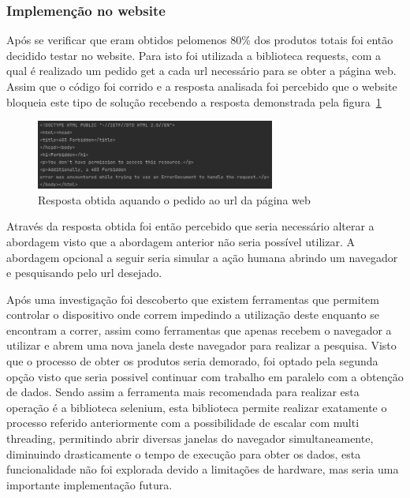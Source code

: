 \newpage

\subsubsection{Implemenção no website}

Após se verificar que eram obtidos pelomenos 80\% dos produtos totais foi então decidido testar no website. Para isto foi utilizada a biblioteca
requests, com a qual é realizado um pedido get a cada url necessário para se obter a página web. Assim que o código foi corrido e a resposta analisada
foi percebido que o website bloqueia este tipo de solução recebendo a resposta demonstrada pela figura~\ref{fig:56}

\begin{figure}[htb]
    \centering
    
    \includegraphics[width=0.7\textwidth]{images/implementacao/scraper/forbiden_response.png}
    \caption{Resposta obtida aquando o pedido ao url da página web}
    \label{fig:56}
\end{figure}

Através da resposta obtida foi então percebido que seria necessário alterar a abordagem visto que a abordagem anterior não seria possível utilizar.
A abordagem opcional a seguir seria simular a ação humana abrindo um navegador e pesquisando pelo url desejado. 

Após uma investigação foi descoberto que existem ferramentas que permitem controlar o dispositivo onde correm impedindo a utilização deste enquanto se 
encontram a correr, assim como ferramentas que apenas recebem o navegador a utilizar e abrem uma nova janela deste navegador para realizar a pesquisa.
Visto que o processo de obter os produtos seria demorado, foi optado pela segunda opção visto que seria possivel continuar com trabalho em paralelo com a
obtenção de dados. Sendo assim a ferramenta mais recomendada para realizar esta operação é a biblioteca selenium, esta biblioteca permite realizar exatamente
o processo referido anteriormente com a possibilidade de escalar com multi threading, permitindo abrir diversas janelas do navegador simultaneamente,
diminuindo drasticamente o tempo de execução para obter os dados, esta funcionalidade não foi explorada devido a limitações de hardware, 
mas seria uma importante implementação futura.

